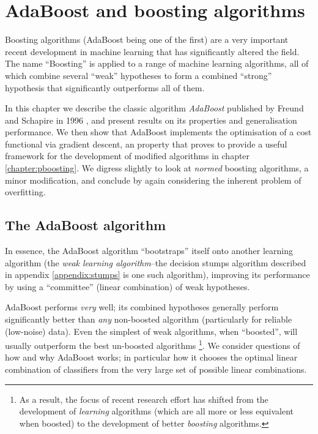 

\chapter{AdaBoost and boosting algorithms}
\label{chapter:boosting}

Boosting algorithms (AdaBoost being one of the first) are a very
important recent development in machine learning that has
significantly altered the field.  The name ``Boosting'' is applied to
a range of  machine learning algorithms, all of which combine several
``weak'' hypotheses to form a combined ``strong'' hypothesis that
significantly outperforms all of them.

In this chapter we describe the classic algorithm \emph{AdaBoost}
published by Freund and Schapire in 1996 \cite{Freund96}, and present
results on its properties and generalisation performance.  We then
show that AdaBoost implements the optimisation of a cost functional
via gradient descent, an property that proves to provide a useful
framework for the development of modified algorithms in chapter
\ref{chapter:pboosting}. We digress slightly to look at \emph{normed}
boosting algorithms, a minor modification, and conclude by again
considering the inherent problem of overfitting.

\section{The AdaBoost algorithm}

In essence, the AdaBoost algorithm ``bootstraps'' itself onto another
learning algorithm (the \emph{weak learning algorithm}--the decision
stumps algorithm described in appendix \ref{appendix:stumps} is one
such algorithm), improving its performance by using a ``committee''
(linear combination) of weak hypotheses.

AdaBoost performs \emph{very} well; its combined hypotheses generally
perform significantly better than \emph{any} non-boosted algorithm
(particularly for reliable (low-noise) data).  Even the simplest of
weak algorithms, when ``boosted'', will usually outperform the best
un-boosted algorithms%
\footnote{As a result, the focus of recent research effort has shifted
from the development of \emph{learning} algorithms (which are all more 
or less equivalent when boosted) to the development of better
\emph{boosting} algorithms.}.
We consider questions of how and why AdaBoost works; in particular how
it chooses the optimal linear combination of classifiers from the very
large set of possible linear combinations. 

